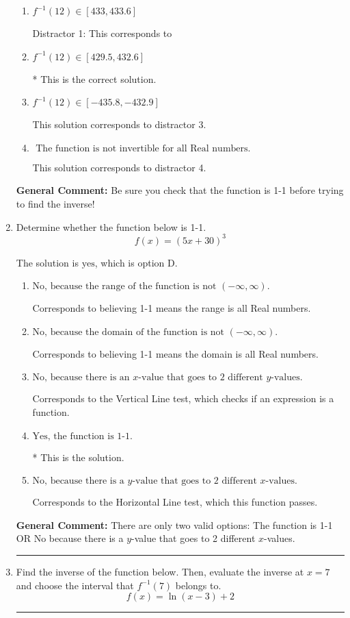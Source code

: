 \documentclass{extbook}[14pt]
\newcommand{\litem}[1]{\item #1

\rule{\textwidth}{0.4pt}}
\begin{document}
\begin{enumerate}
{\begin{enumerate}[label=\Alph*.]
 This solution corresponds to distractor 2.
\item \( f^{-1}(12) \in [433, 433.6] \)

 Distractor 1: This corresponds to 
\item \( f^{-1}(12) \in [429.5, 432.6] \)

* This is the correct solution.
\item \( f^{-1}(12) \in [-435.8, -432.9] \)

 This solution corresponds to distractor 3.
\item \( \text{ The function is not invertible for all Real numbers. } \)

 This solution corresponds to distractor 4.
\end{enumerate}

\textbf{General Comment:} Be sure you check that the function is 1-1 before trying to find the inverse!
}
\litem{
Determine whether the function below is 1-1.
\[ f(x) = (5 x + 30)^3 \]

The solution is \( \text{yes} \), which is option D.\begin{enumerate}[label=\Alph*.]
\item \( \text{No, because the range of the function is not $(-\infty, \infty)$.} \)

Corresponds to believing 1-1 means the range is all Real numbers.
\item \( \text{No, because the domain of the function is not $(-\infty, \infty)$.} \)

Corresponds to believing 1-1 means the domain is all Real numbers.
\item \( \text{No, because there is an $x$-value that goes to 2 different $y$-values.} \)

Corresponds to the Vertical Line test, which checks if an expression is a function.
\item \( \text{Yes, the function is 1-1.} \)

* This is the solution.
\item \( \text{No, because there is a $y$-value that goes to 2 different $x$-values.} \)

Corresponds to the Horizontal Line test, which this function passes.
\end{enumerate}

\textbf{General Comment:} There are only two valid options: The function is 1-1 OR No because there is a $y$-value that goes to 2 different $x$-values.
}
\litem{
Find the inverse of the function below. Then, evaluate the inverse at $x = 7$ and choose the interval that $f^{-1}(7)$ belongs to.
\[ f(x) = \ln{(x-3)}+2 \]

}
\end{enumerate}
\end{document}
